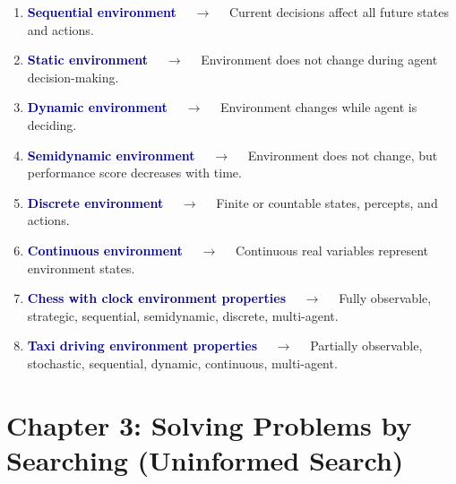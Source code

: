 \documentclass[11pt,a4paper]{article}
\begin{document}
\begin{enumerate}[label=\arabic*., leftmargin=*, labelsep=0.8em, itemsep=0.35em, parsep=0.1em, topsep=0.2em]
  \item \textcolor{darkblue}{\textbf{Sequential environment}} $\quad\to\quad$ Current decisions affect all future states and actions.
  \item \textcolor{darkblue}{\textbf{Static environment}} $\quad\to\quad$ Environment does not change during agent decision-making.
  \item \textcolor{darkblue}{\textbf{Dynamic environment}} $\quad\to\quad$ Environment changes while agent is deciding.
  \item \textcolor{darkblue}{\textbf{Semidynamic environment}} $\quad\to\quad$ Environment does not change, but performance score decreases with time.
  \item \textcolor{darkblue}{\textbf{Discrete environment}} $\quad\to\quad$ Finite or countable states, percepts, and actions.
  \item \textcolor{darkblue}{\textbf{Continuous environment}} $\quad\to\quad$ Continuous real variables represent environment states.
  \item \textcolor{darkblue}{\textbf{Chess with clock environment properties}} $\quad\to\quad$ Fully observable, strategic, sequential, semidynamic, discrete, multi-agent.
  \item \textcolor{darkblue}{\textbf{Taxi driving environment properties}} $\quad\to\quad$ Partially observable, stochastic, sequential, dynamic, continuous, multi-agent.
\end{enumerate}

\section*{Chapter 3: Solving Problems by Searching (Uninformed Search)}
\end{document}
